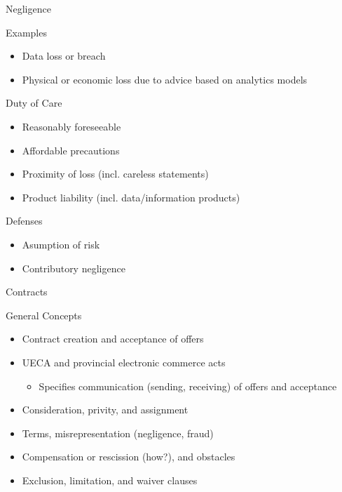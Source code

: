 \documentclass[ignorenonframetext,xcolor=x11names]{beamer}
\begin{document}
\begin{frame}{Negligence}
\begin{block}{Examples}
\begin{itemize}
  \item Data loss or breach
  \item Physical or economic loss due to advice based on analytics models
\end{itemize}
\end{block}

\begin{block}{Duty of Care}
  \begin{itemize}
    \item Reasonably foreseeable
    \item Affordable precautions
    \item Proximity of loss (incl. careless statements)
    \item Product liability (incl. data/information products)
  \end{itemize}
\end{block}
\begin{block}{Defenses}
  \begin{itemize}
     \item Asumption of risk
     \item Contributory negligence
  \end{itemize}
\end{block}
\end{frame}

\begin{frame}{Contracts} 
  \begin{block}{General Concepts}
  \begin{itemize}
     \item Contract creation and acceptance of offers
     \item UECA and provincial electronic commerce acts
     \begin{itemize}
        \item Specifies communication (sending, receiving) of offers and acceptance
     \end{itemize}
     \item Consideration, privity, and assignment
     \item Terms, misrepresentation (negligence, fraud)
     \item Compensation or rescission (how?), and obstacles
     \item Exclusion, limitation, and waiver clauses
  \end{itemize}
  \end{block}
\end{frame}
\end{document}
